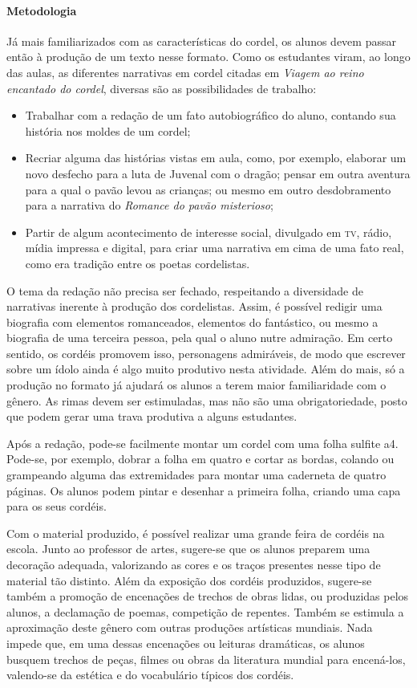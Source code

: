 \documentclass[11pt]{extarticle}
\begin{document}
\paragraph{Metodologia} Já mais familiarizados com as características do cordel, os alunos devem passar então à produção de um texto nesse formato. Como os estudantes viram, ao longo das aulas, as diferentes narrativas em cordel citadas em \textit{Viagem ao reino encantado do cordel}, diversas são as possibilidades de trabalho:

\begin{itemize}
\item Trabalhar com a redação de um fato autobiográfico do aluno, contando sua história nos moldes de um cordel;

\item Recriar alguma das histórias vistas em aula, como, por exemplo, elaborar um novo desfecho para a luta de Juvenal com o dragão; pensar em outra aventura para a qual o pavão levou as crianças; ou mesmo em outro desdobramento para a narrativa do \textit{Romance do pavão misterioso};

\item Partir de algum acontecimento de interesse social, divulgado em \textsc{tv}, rádio, mídia impressa e digital, para criar uma narrativa em cima de uma fato real, como era tradição entre os poetas cordelistas.
\end{itemize}

O tema da redação não precisa ser fechado, respeitando a diversidade de narrativas inerente à produção dos cordelistas. Assim, é possível redigir uma biografia com elementos romanceados, elementos do fantástico, ou mesmo a biografia de uma terceira pessoa, pela qual o aluno nutre admiração. Em certo sentido, os cordéis promovem isso,
personagens admiráveis, de modo que escrever sobre um ídolo ainda é algo
muito produtivo nesta atividade. Além do mais, só a produção no formato
já ajudará os alunos a terem maior familiaridade com o gênero. As rimas
devem ser estimuladas, mas não são uma obrigatoriedade, posto que podem
gerar uma trava produtiva a alguns estudantes.

Após a redação, pode-se facilmente montar um cordel com uma folha sulfite a4. 
Pode-se, por exemplo, dobrar a folha em quatro e cortar as bordas, colando ou grampeando alguma das extremidades para montar uma caderneta de quatro páginas.
Os alunos podem pintar e desenhar a primeira folha, criando uma capa para os seus cordéis.

Com o material produzido, é possível realizar uma grande
feira de cordéis na escola. Junto ao professor de artes, sugere-se que
os alunos preparem uma decoração adequada, valorizando as cores e os
traços presentes nesse tipo de material tão distinto. Além da exposição
dos cordéis produzidos, sugere-se também a promoção de encenações de
trechos de obras lidas, ou produzidas pelos alunos, a declamação de
poemas, competição de repentes. Também se estimula a aproximação deste
gênero com outras produções artísticas mundiais. Nada impede que, em uma
dessas encenações ou leituras dramáticas, os alunos busquem trechos
de peças, filmes ou obras da literatura mundial para encená-los, valendo-se
da estética e do vocabulário típicos dos cordéis.
\end{document}
